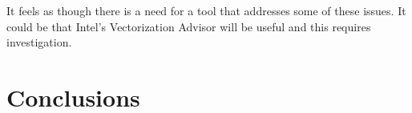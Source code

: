 \documentclass[12pt]{article}
\begin{document}
It feels as though there is a need for a tool that addresses some of
these issues. It could be that Intel's Vectorization Advisor will be
useful and this requires investigation.


\section{Conclusions}



\end{document}
